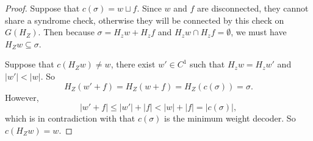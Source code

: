 \documentclass[twoside,english,aps,showpacs,pra,superscriptaddress]{revtex4-2}
\begin{document}
\begin{proof}
    Suppose that $c(\sigma) = w \sqcup f$. Since $w$ and $f$ are disconnected, they cannot share a syndrome check, otherwise they will be connected by this check on $G(H_Z)$. Then because $\sigma = H_z w + H_z f$ and $H_zw \cap H_z f = \emptyset$, we must have $H_Z w \subseteq \sigma$.

    Suppose that $c(H_Z w) \neq w$, there exist $w' \in C^1$ such that $H_z w =H_z w'$ and $|w'| < |w|$. So
    \begin{equation}
        H_Z (w'+f) = H_Z(w+f) = H_Z(c(\sigma)) = \sigma.
    \end{equation}
    However,
    \begin{equation}
        |w'+f| \leq |w'|+|f| < |w|+|f| =|c(\sigma)|,
    \end{equation}
    which is in contradiction with that $c(\sigma)$ is the minimum weight decoder.
    So $c(H_Z w) = w$.
\end{proof}
\end{document}
